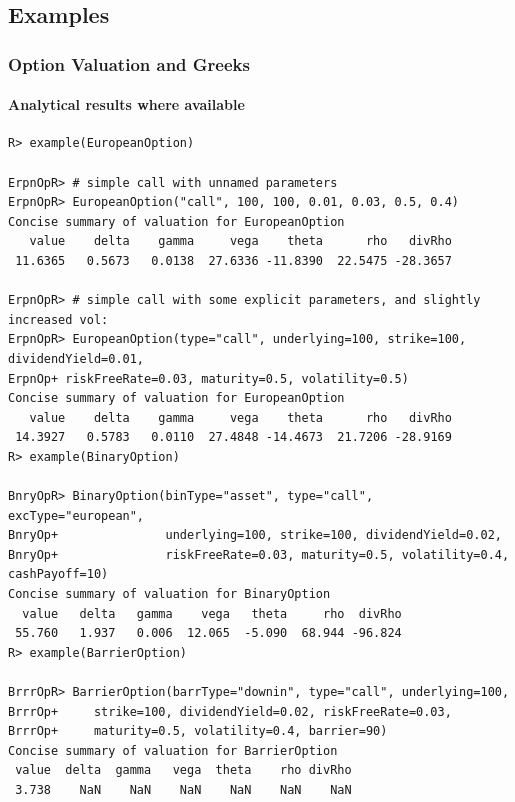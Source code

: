 \documentclass[compress]{beamer}
\begin{document}
\subsection{Examples}
\begin{frame}[fragile]
  \frametitle{Option Valuation and Greeks}
  \framesubtitle{Analytical results where available}
\tiny   \begin{verbatim}
R> example(EuropeanOption)

ErpnOpR> # simple call with unnamed parameters
ErpnOpR> EuropeanOption("call", 100, 100, 0.01, 0.03, 0.5, 0.4)
Concise summary of valuation for EuropeanOption 
   value    delta    gamma     vega    theta      rho   divRho 
 11.6365   0.5673   0.0138  27.6336 -11.8390  22.5475 -28.3657 

ErpnOpR> # simple call with some explicit parameters, and slightly increased vol:
ErpnOpR> EuropeanOption(type="call", underlying=100, strike=100, dividendYield=0.01, 
ErpnOp+ riskFreeRate=0.03, maturity=0.5, volatility=0.5)
Concise summary of valuation for EuropeanOption 
   value    delta    gamma     vega    theta      rho   divRho 
 14.3927   0.5783   0.0110  27.4848 -14.4673  21.7206 -28.9169 
R> example(BinaryOption)

BnryOpR> BinaryOption(binType="asset", type="call", excType="european",
BnryOp+               underlying=100, strike=100, dividendYield=0.02,
BnryOp+               riskFreeRate=0.03, maturity=0.5, volatility=0.4, cashPayoff=10)
Concise summary of valuation for BinaryOption 
  value   delta   gamma    vega   theta     rho  divRho 
 55.760   1.937   0.006  12.065  -5.090  68.944 -96.824 
R> example(BarrierOption)

BrrrOpR> BarrierOption(barrType="downin", type="call", underlying=100,
BrrrOp+ 	strike=100, dividendYield=0.02, riskFreeRate=0.03,
BrrrOp+ 	maturity=0.5, volatility=0.4, barrier=90)
Concise summary of valuation for BarrierOption 
 value  delta  gamma   vega  theta    rho divRho 
 3.738    NaN    NaN    NaN    NaN    NaN    NaN 
 
\end{verbatim}
\end{frame}
\end{document}

